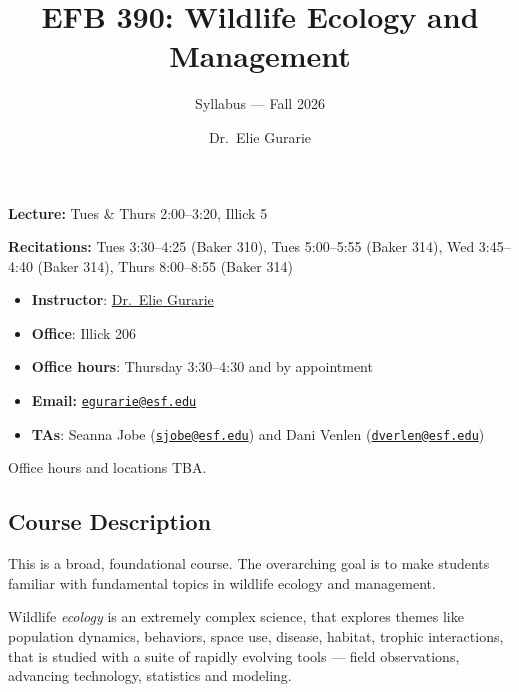 \documentclass[
  letterpaper,
  DIV=11,
  numbers=noendperiod]{scrartcl}
\title{EFB 390: Wildlife Ecology and Management}
\subtitle{Syllabus --- Fall 2026}
\author{Dr.~Elie Gurarie}
\date{}
\begin{document}
\maketitle


\begin{tcolorbox}[enhanced jigsaw, arc=.35mm, bottomrule=.15mm, breakable, colback=white, colframe=quarto-callout-note-color-frame, left=2mm, leftrule=.75mm, opacityback=0, rightrule=.15mm, toprule=.15mm]
\begin{minipage}[t]{5.5mm}
\textcolor{quarto-callout-note-color}{\faInfo}
\end{minipage}%
\begin{minipage}[t]{\textwidth - 5.5mm}

\textbf{Lecture:} Tues \& Thurs 2:00--3:20, Illick 5

\textbf{Recitations:} Tues 3:30--4:25 (Baker 310), Tues 5:00--5:55
(Baker 314), Wed 3:45--4:40 (Baker 314), Thurs 8:00--8:55 (Baker 314)

\end{minipage}%
\end{tcolorbox}

\begin{itemize}
\item
  \textbf{Instructor}: \href{https://eligurarie.github.io/}{Dr.~Elie
  Gurarie}
\item
  \textbf{Office}: Illick 206
\item
  \textbf{Office hours}: Thursday 3:30--4:30 and by appointment
\item
  \textbf{Email:}
  \href{mailto:egurarie@esf.edu}{\nolinkurl{egurarie@esf.edu}}
\item
  \textbf{TAs}: Seanna Jobe
  (\href{mailto:sjobe@esf.edu}{\nolinkurl{sjobe@esf.edu}}) and Dani
  Venlen (\href{mailto:dverlen@esf.edu}{\nolinkurl{dverlen@esf.edu}})
\end{itemize}

Office hours and locations TBA.

\subsection{Course Description}\label{course-description}

This is a broad, foundational course. The overarching goal is to make
students familiar with fundamental topics in wildlife ecology and
management.

Wildlife \emph{ecology} is an extremely complex science, that explores
themes like population dynamics, behaviors, space use, disease, habitat,
trophic interactions, that is studied with a suite of rapidly evolving
tools --- field observations, advancing technology, statistics and
modeling.
\end{document}
